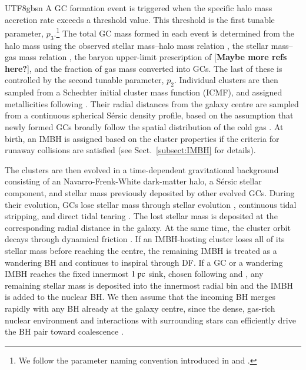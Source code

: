 \documentclass[trackchanges, twocolappendix, twocolumn]{aastex701}
\newcommand{\czkong}[1]{{\color{magenta}[\textbf{#1}]}}
\begin{document}
\begin{CJK*}{UTF8}{gbsn}
A GC formation event is triggered when the specific halo mass accretion rate exceeds a threshold value. This threshold is the first tunable parameter, $p_3$.\footnote{We follow the parameter naming convention introduced in \cite{Muratov&Gnedin2010GC} and \cite{Li+2014GC}.} The total GC mass formed in each event is determined from the halo mass using the observed stellar mass--halo mass relation \citep{Behroozi+2013DM}, the stellar mass--gas mass relation \citep{Magdis+2012SMGM, Tacconi+2013SMGM, Lilly+2013SMGM, Genzel+2015SMGM, Tacconi+2018SMGM}, the baryon upper-limit prescription of \cite{Chen&Gnedin2024aGC} \czkong{Maybe more refs here?}, and the fraction of gas mass converted into GCs. The last of these is controlled by the second tunable parameter, $p_2$. Individual clusters are then sampled from a Schechter initial cluster mass function (ICMF), and assigned metallicities following \cite{Chen&Gnedin2024aGC}. Their radial distances from the galaxy centre are sampled from a continuous spherical S{\'e}rsic density profile, based on the assumption that newly formed GCs broadly follow the spatial distribution of the cold gas \cite{Gao+2024GC}. At birth, an IMBH is assigned based on the cluster properties if the criteria for runaway collisions are satisfied (see Sect.~\ref{subsect:IMBH} for details).

The clusters are then evolved in a time-dependent gravitational background consisting of an Navarro-Frenk-White \citep{Navarro&Frenk&White1997DM} dark-matter halo, a S{\'e}rsic stellar component, and stellar mass previously deposited by other evolved GCs. During their evolution, GCs lose stellar mass through stellar evolution \citep{Conroy&Gunn2010}, continuous tidal stripping, and direct tidal tearing \citep{Fragione+2019GC}. The lost stellar mass is deposited at the corresponding radial distance in the galaxy. At the same time, the cluster orbit decays through dynamical friction \citep[DF;][]{Gao+2024GC}. If an IMBH-hosting cluster loses all of its stellar mass before reaching the centre, the remaining IMBH is treated as a wandering BH and continues to inspiral through DF. If a GC or a wandering IMBH reaches the fixed innermost $1~{\rm pc}$ sink, chosen following \cite{Gnedin+2014GC} and \cite{Gao+2024GC}, any remaining stellar mass is deposited into the innermost radial bin and the IMBH is added to the nuclear BH. We then assume that the incoming BH merges rapidly with any BH already at the galaxy centre, since the dense, gas-rich nuclear environment and interactions with surrounding stars can efficiently drive the BH pair toward coalescence \citep{Souvaitzis+2025, Souvaitzis+2026}.


\end{CJK*}
\end{document}
